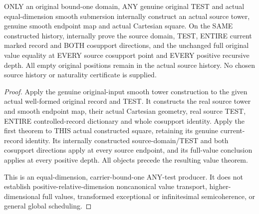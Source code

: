 \begin{theorem}
\label{hir:original-only-any-test-curve-etale-full-value-producer}
\leanok
ONLY an original bound-one domain, ANY genuine original TEST and actual
equal-dimension smooth submersion internally construct an actual source
tower, genuine smooth endpoint map and actual Cartesian square. On the
SAME constructed history, internally prove the source domain, TEST,
ENTIRE current marked record and BOTH cosupport directions, and the
unchanged full original value equality at EVERY source cosupport point
and EVERY positive recursive depth. All empty original positions remain
in the actual source history. No chosen source history or naturality
certificate is supplied.
\end{theorem}
\begin{proof}
Apply the genuine original-input smooth tower construction to the given
actual well-formed original record and TEST. It constructs the real
source tower and smooth endpoint map, their actual Cartesian geometry,
real source TEST, ENTIRE controlled-record dictionary and whole
cosupport identity. Apply the first theorem to THIS actual constructed
square, retaining its genuine current-record identity. Its internally
constructed source-domain/TEST and both cosupport directions apply at
every source endpoint, and its full-value conclusion applies at every
positive depth. All objects precede the resulting value theorem.

This is an equal-dimension, carrier-bound-one ANY-test producer. It does
not establish positive-relative-dimension noncanonical value transport,
higher-dimensional full values, transformed exceptional or infinitesimal
semicoherence, or general global scheduling.
\end{proof}
